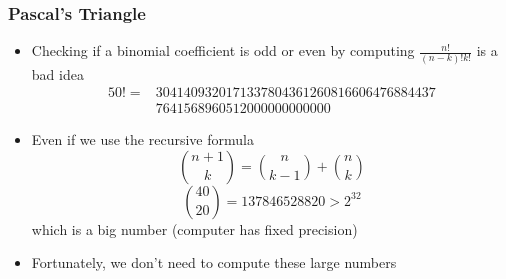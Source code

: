 \documentclass{beamer}
\begin{document}
\begin{frame}
    \frametitle{Pascal's Triangle}
    \begin{itemize}
        \item Checking if a binomial coefficient is odd or even by computing $\frac{n!}{(n-k)!k!}$ is a bad idea
        \begin{align*}
            50! = &3041409320171337804361260816606476884437\\
            &7641568960512000000000000   
        \end{align*}
        \item Even if we use the recursive formula 
        \begin{equation*}
            \binom{n+1}{k}= \binom{n}{k-1} + \binom{n}{k}
        \end{equation*}
        \begin{equation*}
            \binom{40}{20} = 137846528820 > 2^{32}
        \end{equation*}
        which is a big number (computer has fixed precision)
        \item Fortunately, we don't need to compute these large numbers
        \end{itemize}
\end{frame}
\end{document}
